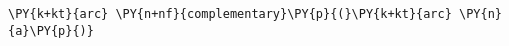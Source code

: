 \begin{Verbatim}[commandchars=\\\{\}]
    \PY{k+kt}{arc} \PY{n+nf}{complementary}\PY{p}{(}\PY{k+kt}{arc} \PY{n}{a}\PY{p}{)}
\end{Verbatim}
